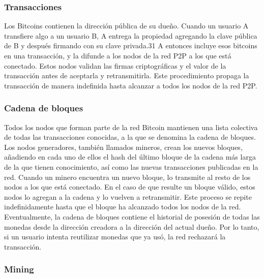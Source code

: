 \subsubsection{Transacciones}

Los Bitcoins contienen la direcci\'on p\'ublica de su dueño. Cuando un usuario A transfiere algo a un usuario B, A entrega la propiedad agregando la clave p\'ublica de B y despu\'es firmando con su clave privada.31 A entonces incluye esos bitcoins en una transacci\'on, y la difunde a los nodos de la red P2P a los que est\'a conectado. Estos nodos validan las firmas criptogr\'aficas y el valor de la transacci\'on antes de aceptarla y retransmitirla. Este procedimiento propaga la transacci\'on de manera indefinida hasta alcanzar a todos los nodos de la red P2P.

\subsubsection{Cadena de bloques}

Todos los nodos que forman parte de la red Bitcoin mantienen una lista colectiva de todas las transacciones conocidas, a la que se denomina la cadena de bloques. Los nodos generadores, tambi\'en llamados mineros, crean los nuevos bloques, añadiendo en cada uno de ellos el hash del \'ultimo bloque de la cadena m\'as larga de la que tienen conocimiento, as\'i como las nuevas transacciones publicadas en la red. Cuando un minero encuentra un nuevo bloque, lo transmite al resto de los nodos a los que est\'a conectado. En el caso de que resulte un bloque v\'alido, estos nodos lo agregan a la cadena y lo vuelven a retransmitir. Este proceso se repite indefinidamente hasta que el bloque ha alcanzado todos los nodos de la red. Eventualmente, la cadena de bloques contiene el historial de posesi\'on de todas las monedas desde la direcci\'on creadora a la direcci\'on del actual dueño. Por lo tanto, si un usuario intenta reutilizar monedas que ya us\'o, la red rechazar\'a la transacci\'on.

\subsubsection{Mining}


